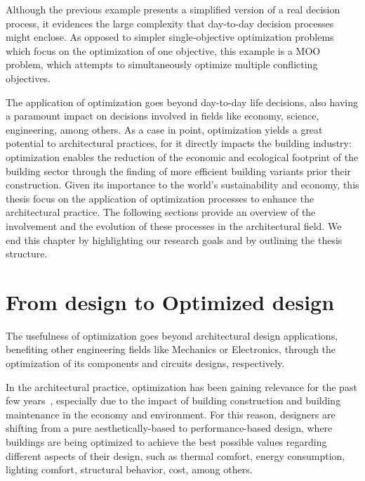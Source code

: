 	Although the previous example presents a simplified version of a real decision process, it evidences the large complexity that day-to-day decision processes might enclose. As opposed to simpler single-objective optimization problems which focus on the optimization of one objective, this example is a \ac{MOO} problem, which attempts to simultaneously optimize multiple conflicting objectives.
	
	The application of optimization goes beyond day-to-day life decisions, also having a paramount impact on decisions involved in fields like economy, science, engineering, among others. As a case in point, optimization yields a great potential to architectural practices, for it directly impacts the building industry: optimization enables the reduction of the economic and ecological footprint of the building sector through the finding of more efficient building variants prior their construction. Given its importance to the world's sustainability and economy, this thesis focus on the application of optimization processes to enhance the architectural practice. The following sections provide an overview of the involvement and the evolution of these processes in the architectural field. We end this chapter by highlighting our research goals and by outlining the thesis structure.

\section{From design to Optimized design}
	
	The usefulness of optimization goes beyond architectural design applications, benefiting other engineering fields like Mechanics or Electronics, through the optimization of its components and circuits designs, respectively. 
	
	In the architectural practice, optimization has been gaining relevance for the past few years~\cite{Cichocka2017SURVEY}, especially due to the impact of building construction and building maintenance in the economy and environment. For this reason, designers are shifting from a pure aesthetically-based to performance-based design, where buildings are being optimized to achieve the best possible values regarding different aspects of their design, such as thermal comfort, energy consumption, lighting comfort, structural behavior, cost, among others.

